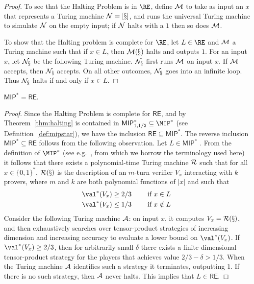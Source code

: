 \begin{proof}
  To see that the Halting Problem is in $\RE$, define $\cal{M}$ to take as input
  an $x$ that represents a Turing machine $\cal{N} = [x]$, and runs the
  universal Turing machine to simulate $\cal{N}$ on the empty input; if $\cal{N}$
  halts with a $1$ then so does $\cal{M}$.

  To show that the Halting problem is complete for $\RE$, let $L\in \RE$ and
  $\cal{M}$ a Turing machine such that if $x \in L$, then $\cal{M}(x)$ halts and
  outputs $1$.
  For an input $x$, let $\cal{N}_x$ be the following Turing machine.
  $\cal{N}_x$ first runs $\cal{M}$ on input $x$.
  If $\cal{M}$ accepts, then $\cal{N}_x$ accepts.
  On all other outcomes, $\cal{N}_x$ goes into an infinite loop.
  Thus $\cal{N}_x$ halts if and only if $x \in L$. 
\end{proof}

\begin{corollary}\label{cor:mip-re}
	$\mathsf{MIP}^* = \mathsf{RE}$.
\end{corollary}
\begin{proof}
	Since the Halting Problem is complete for $\mathsf{RE}$, and by
  Theorem~\ref{thm:halting} is contained in $\mathsf{MIP}^*_{1,1/2}\subseteq \MIP^*$ (see Definition~\ref{def:mipstar}), we have the
  inclusion $\mathsf{RE} \subseteq \mathsf{MIP}^*$.
  The reverse inclusion $\mathsf{MIP}^* \subseteq \mathsf{RE}$ follows from the
  following observation.
  Let $L \in \mathsf{MIP}^*$ .
  From the definition of $\MIP^*$ (see e.g.~\cite[Section
  6.1]{vidick2016quantum}, from which we borrow the terminology used here) it
  follows that there exists a polynomial-time Turing machine $\cal{R}$ such that
  for all $x \in \{0,1\}^*$, $\cal{R}(x)$ is the description of an $m$-turn
  verifier $V_x$ interacting with $k$ provers, where $m$ and $k$ are both
  polynomial functions of $|x|$ and such that
	\begin{gather*}
		\val^*(V_x) \geq 2/3 \qquad \text{ if $x \in L$ } \\
		\val^*(V_x)	\leq 1/3 \qquad \text{ if $x \notin L$ }
	\end{gather*}
	Consider the following Turing machine $\cal{A}$: on input $x$, it computes
  $V_x = \cal{R}(x)$, and then exhaustively searches over tensor-product
  strategies of increasing dimension and increasing accuracy to evaluate a lower
  bound on $\val^*(V_x)$.
  If $\val^*(V_x) \geq 2/3$, then for arbitrarily small $\delta$ there exists a
  finite dimensional tensor-product strategy for the players that achieves value
  $2/3 - \delta > 1/3$.
  When the Turing machine $\cal{A}$ identifies such a strategy it terminates,
  outputting $1$.
  If there is no such strategy, then $\cal{A}$ never halts.
  This implies that $L \in \mathsf{RE}$.
\end{proof}
	
